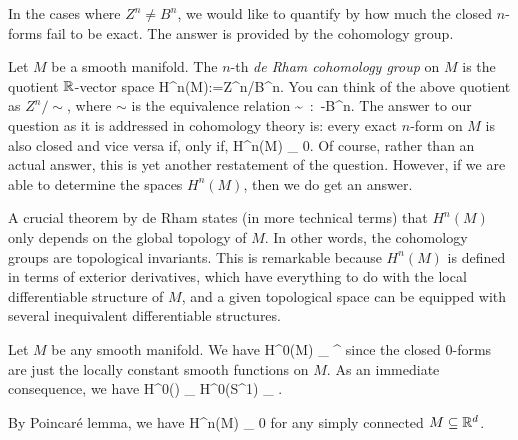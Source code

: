 In the cases where $Z^n\neq B^n$, we would like to quantify by how much the closed $n$-forms fail to be exact. The answer is provided by the cohomology group.

\bd
Let $M$ be a smooth manifold. The $n$-th \emph{de Rham cohomology group} on $M$ is the quotient $\mathbb{R}$-vector space
\bse
H^n(M):=Z^n/B^n.
\ese
\ed
You can think of the above quotient as $Z^n/\!\sim$, where $\sim$ is the equivalence relation
\bse
\omega \sim \sigma\ :\Leftrightarrow\ \omega-\sigma \in B^n.
\ese
The answer to our question as it is addressed in cohomology theory is: every exact $n$-form on $M$ is also closed and vice versa if, only if,
\bse
H^n(M) \cong_ 0.
\ese
Of course, rather than an actual answer, this is yet another restatement of the question. However, if we are able to determine the spaces $H^n(M)$, then we do get an answer.

A crucial theorem by de Rham states (in more technical terms) that $H^n(M)$ only depends on the global topology of $M$. In other words, the cohomology groups are topological invariants.
This is remarkable because $H^n(M)$ is defined in terms of exterior derivatives, which have everything to do with the local differentiable structure of $M$, and a given topological space can be equipped with several inequivalent differentiable structures. 

\be
Let $M$ be any smooth manifold. We have
\bse
H^0(M) \cong_ \R^{}
\ese
since the closed $0$-forms are just the locally constant smooth functions on $M$. As an immediate consequence, we have
\bse
H^0(\R) \cong_ H^0(S^1) \cong_ \R.
\ese
\ee

\be
By Poincar\'e lemma, we have
\bse
H^n(M) \cong_ 0
\ese
for any simply connected $M\subseteq\mathbb{R}^d$.
\ee




















